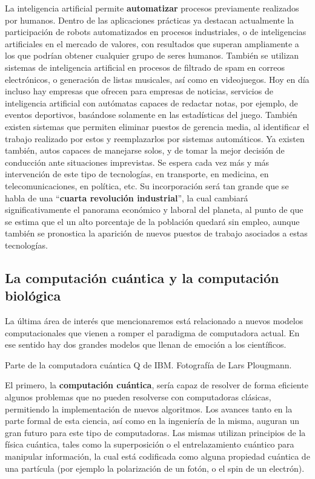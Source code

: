 La inteligencia artificial permite \textbf{automatizar} procesos previamente
realizados por humanos. Dentro de las aplicaciones prácticas ya destacan
actualmente la participación de robots automatizados en procesos industriales, o
de inteligencias artificiales en el mercado de valores, con resultados que
superan ampliamente a los que podrían obtener cualquier grupo de seres humanos.
También se utilizan sistemas de inteligencia artificial en procesos de filtrado
de spam en correos electrónicos, o generación de listas musicales, así como en
videojuegos. Hoy en día incluso hay empresas que ofrecen para empresas de
noticias, servicios de inteligencia artificial con autómatas capaces de redactar
notas, por ejemplo, de eventos deportivos, basándose solamente en las
estadísticas del juego. También existen sistemas que permiten eliminar puestos
de gerencia media, al identificar el trabajo realizado por estos y reemplazarlos
por sistemas automáticos. Ya existen también, autos capaces de manejarse solos,
y de tomar la mejor decisión de conducción ante situaciones
imprevistas. Se
espera cada vez más y más intervención de este tipo de tecnologías, en
transporte, en medicina, en telecomunicaciones, en política, etc. Su
incorporación será tan grande que se habla de una ``\textbf{cuarta revolución
industrial}'', la cual cambiará significativamente el panorama económico y
laboral del planeta, al punto de que se estima que el un alto porcentaje de la
población quedará sin empleo, aunque también se pronostica la aparición de
nuevos puestos de trabajo asociados a estas tecnologías.\autocite{wef_2016}


\subsection{La computación cuántica y la computación biológica}
\label{chap:historia_computadoras:subsec:cuantica}

La última área de interés que mencionaremos está relacionado a nuevos modelos
computacionales que vienen a romper el paradigma de computadora actual. En ese
sentido hay dos grandes modelos que llenan de emoción a los científicos.

{Parte de la computadora cuántica Q de IBM.} {Fotografía de Lars Plougmann.}

El primero, la \textbf{computación cuántica}, sería capaz de resolver de forma
eficiente algunos problemas que no pueden resolverse con computadoras clásicas,
permitiendo la implementación de nuevos algoritmos. Los avances tanto en la
parte formal de esta ciencia, así como en la ingeniería de la misma, auguran un
gran futuro para este tipo de computadoras. Las mismas utilizan principios de la
física cuántica, tales como la superposición o el entrelazamiento cuántico para
manipular información, la cual está codificada como alguna propiedad cuántica de
una partícula (por ejemplo la polarización de un fotón, o el spin de un
electrón).\autocite{nielsen_2011}

